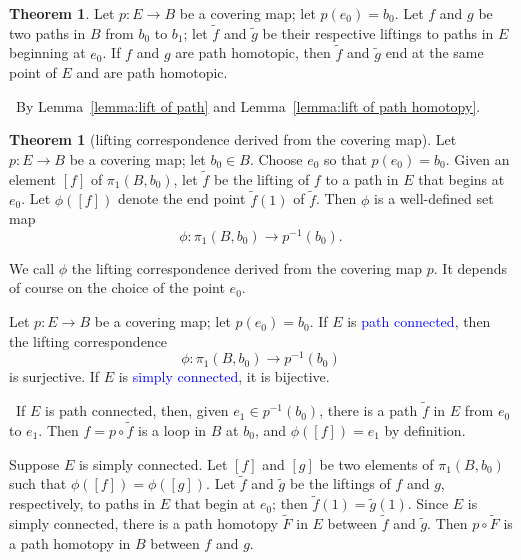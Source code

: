 \documentclass[12pt,a4paper]{book}
\newenvironment{prooff}{{\noindent\it\textcolor{cyan!40!black}{Proof}:}\,}{\par}
\newcommand{\blue}[1]{\textcolor{blue}{#1}}
\theoremstyle{definition}
\newtheorem{theo}[defn]{Theorem}
\begin{document}
\begin{theo}
    Let $p: E \rightarrow B$ be a covering map; let $p\left(e_0\right)=b_0$. Let $f$ and $g$ be two paths in $B$ from $b_0$ to $b_1$; let $\tilde{f}$ and $\tilde{g}$ be their respective liftings to paths in $E$ beginning at $e_0$. If $f$ and $g$ are path homotopic, then $\tilde{f}$ and $\tilde{g}$ end at the same point of $E$ and are path homotopic.
\end{theo}
\begin{prooff}
    By Lemma~\ref{lemma:lift of path} and Lemma~\ref{lemma:lift of path homotopy}.
\end{prooff}

\begin{theo}[lifting correspondence derived from the covering map]
    Let $p: E \rightarrow B$ be a covering map; let $b_0 \in B$. Choose $e_0$ so that $p\left(e_0\right)=b_0$. Given an element $[f]$ of $\pi_1\left(B, b_0\right)$, let $\tilde{f}$ be the lifting of $f$ to a path in $E$ that begins at $e_0$. Let $\phi([f])$ denote the end point $\tilde{f}(1)$ of $\tilde{f}$. Then $\phi$ is a well-defined set map
    $$
        \phi: \pi_1\left(B, b_0\right) \rightarrow p^{-1}\left(b_0\right) .
    $$

    We call $\phi$ the lifting correspondence derived from the covering map $p$. It depends of course on the choice of the point $e_0$.

    Let $p: E \rightarrow B$ be a covering map; let $p\left(e_0\right)=b_0$. If $E$ is \blue{path connected}, then the lifting correspondence
    $$
        \phi: \pi_1\left(B, b_0\right) \rightarrow p^{-1}\left(b_0\right)
    $$
    is surjective. If $E$ is \blue{simply connected}, it is bijective.
    \label{tehorem:lifting correspondence}
\end{theo}
\begin{prooff}
    If $E$ is path connected, then, given $e_1 \in p^{-1}\left(b_0\right)$, there is a path $\tilde{f}$ in $E$ from $e_0$ to $e_1$. Then $f=p \circ \tilde{f}$ is a loop in $B$ at $b_0$, and $\phi([f])=e_1$ by definition.

    Suppose $E$ is simply connected. Let $[f]$ and $[g]$ be two elements of $\pi_1\left(B, b_0\right)$ such that $\phi([f])=\phi([g])$. Let $\tilde{f}$ and $\tilde{g}$ be the liftings of $f$ and $g$, respectively, to paths in $E$ that begin at $e_0$; then $\tilde{f}(1)=\tilde{g}(1)$. Since $E$ is simply connected, there is a path homotopy $\tilde{F}$ in $E$ between $\tilde{f}$ and $\tilde{g}$. Then $p \circ \tilde{F}$ is a path homotopy in $B$ between $f$ and $g$.
\end{prooff}
\end{document}
